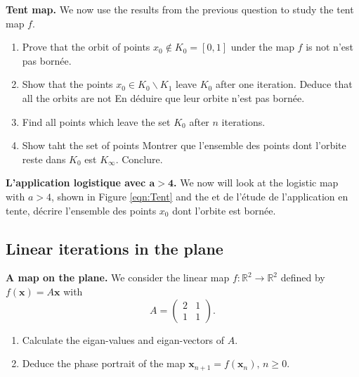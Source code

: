 \documentclass{article}
\begin{document}
   \begin{question}\textbf{Tent map.} We now use the results from the previous question to study the tent map $f$.
  
  \begin{enumerate}[label=(\alph*),resume]
     \item Prove that the orbit of points $x_0\notin K_0=[0,1]$ under the map  $f$ is not n'est pas born\'ee.
     \item Show that the points $x_0\in K_0\backslash K_1$ leave $K_0$ after one iteration. Deduce that all the orbits are not En d\'eduire que leur orbite n'est pas born\'ee.
     
     \item Find all points which leave the set $K_0$ after $n$ iterations.
     
     \item Show taht the set of points Montrer que l'ensemble des points dont l'orbite reste dans $K_0$ est $K_\infty$. Conclure.
          
  \end{enumerate}
     \end{question}
     
\begin{question}
\textbf{L'application logistique avec $\bm{a>4}$.} We now will look at the logistic map with $a>4$, shown in Figure \eqref{eqn:Tent} and the et de l'\'etude de l'application en tente, d\'ecrire l'ensemble des points $x_0$ dont l'orbite est born\'ee.
\end{question}

\subsection*{Linear iterations in the plane}

\begin{question}
  \textbf{A map on the plane.} We consider the linear map $f:\mathbb R^2 \to \mathbb R^2$ defined by $f(\bm x) = A\bm x$ with
  \begin{equation}
    A =
    \begin{pmatrix}
      2 & 1\\
      1 & 1
    \end{pmatrix}.
  \end{equation}
  \begin{enumerate}[label=(\alph*)]
    \item Calculate the eigan-values and eigan-vectors of $A$.
    \item Deduce the phase portrait of the map $\bm x_{n+1} = f(\bm x_n),\, n\geqslant 0$.
  \end{enumerate}
\end{question}
\end{document}
